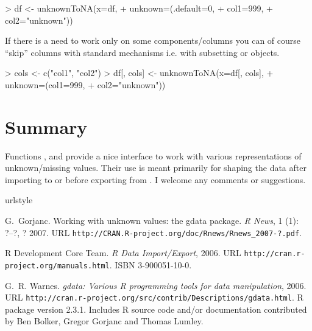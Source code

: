 \documentclass[a4paper]{report}
\begin{document}
\begin{article}
\begin{smallverbatim}
> df <- unknownToNA(x=df,
+                   unknown=(.default=0,
+                            col1=999,
+                            col2="unknown"))
\end{smallverbatim}

If there is a need to work only on some components/columns you can of
course ``skip'' columns with standard \R{} mechanisms i.e.
with subsetting  or  objects.

\begin{smallverbatim}
> cols <- c("col1", "col2")
> df[, cols] <- unknownToNA(x=df[, cols],
+                           unknown=(col1=999,
+                                    col2="unknown"))
\end{smallverbatim}

\section{Summary}

Functions ,  and 
provide a nice interface to work with various representations of
unknown/missing values. Their use is meant primarily for shaping the data
after importing to or before exporting from \R{}. I welcome any comments or
suggestions.

% 

\begin{thebibliography}{1}
\providecommand{\natexlab}[1]{#1}
\providecommand{\url}[1]{\texttt{#1}}
\expandafter\ifx\csname urlstyle\endcsname\relax
  \providecommand{\doi}[1]{doi: #1}\else
  \providecommand{\doi}{doi: \begingroup \urlstyle{rm}\Url}\fi

G.~Gorjanc.
\newblock Working with unknown values: the gdata package.
\newblock \emph{R News}, 1 (1): ?--?, ? 2007.
\newblock URL \url{http://CRAN.R-project.org/doc/Rnews/Rnews_2007-?.pdf}.

{R Development Core Team}.
\newblock \emph{R Data Import/Export}, 2006.
\newblock URL \url{http://cran.r-project.org/manuals.html}.
\newblock ISBN 3-900051-10-0.

G.~R. Warnes.
\newblock \emph{gdata: Various R programming tools for data manipulation},
  2006.
\newblock URL
  \url{http://cran.r-project.org/src/contrib/Descriptions/gdata.html}.
\newblock R package version 2.3.1. Includes R source code and/or documentation
  contributed by Ben Bolker, Gregor Gorjanc and Thomas Lumley.

\end{thebibliography}

\address{Gregor Gorjanc\\
  University of Ljubljana, Slovenia\\
}

\end{article}
\end{document}
